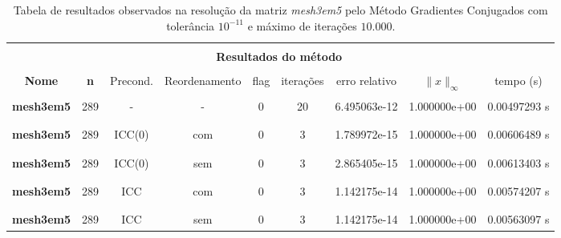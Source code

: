 \begin{table}[ht]
    \centering
    \begin{tabular}{|c|c|c|c|c|c|c|c|c|}
        \hline \rowcolor{Gray}
        \multicolumn{9}{|c|}{\bfseries Tabela do Método dos Gradientes Conjugados com tolerância $10^{-11}$ e máximo de iterações $10.000$ }\\
        \hline \rowcolor{Gray}  \multicolumn{2}{|c|}{} & \multicolumn{7}{|c|}{} \\
         [-1em]  \rowcolor{Gray}
         \multicolumn{2}{|c|}{\bfseries Informações da matriz } & \multicolumn{7}{|c|}{\bfseries Resultados do método }\\
         \hline \rowcolor{Gray} & & & & & & & & \\
         [-1em]
         \rowcolor{Gray}
         \bfseries Nome & \bfseries n & Precond. & Reordenamento & flag & iterações &
         erro relativo &
         $\|x\|_\infty$  & tempo (s) \\
         \hline & & & & & & & & \\
         [-1em] \bfseries mesh3em5 & 289 & - & -  & 0 & 20 & 6.495063e-12 & 1.000000e+00 & 0.00497293 s \\ & & & & & & &  \\ [-1em] \hline \\
         [-1em] \bfseries mesh3em5 & 289 & ICC(0) & com & 0 & 3 & 1.789972e-15 & 1.000000e+00 & 0.00606489 s \\ & & & & & & & & \\ [-1em] \hline \\
         [-1em] \bfseries mesh3em5 & 289 & ICC(0) & sem & 0 & 3 & 2.865405e-15 & 1.000000e+00 & 0.00613403 s \\ & & & & & & & & \\ [-1em] \hline \\
         [-1em] \bfseries mesh3em5 & 289 & ICC & com & 0 & 3 & 1.142175e-14 & 1.000000e+00 & 0.00574207 s \\ & & & & & & & & \\ [-1em] \hline \\
         [-1em] \bfseries mesh3em5 & 289 & ICC & sem & 0 & 3 & 1.142175e-14 & 1.000000e+00 & 0.00563097 s \\ \hline
    \end{tabular}
    \caption{Tabela de resultados observados na resolução da matriz \textit{mesh3em5} pelo Método Gradientes Conjugados com tolerância $10^{-11}$ e máximo de iterações $10.000$.}
    \label{tab:resultados-mesh}
\end{table}